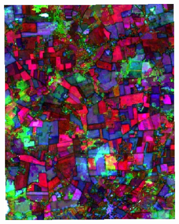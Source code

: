\documentclass[journal,article,submit,pdftex,moreauthors]{Definitions/mdpi}
\providecommand{\DIFaddbeginFL}{} %
\providecommand{\DIFaddendFL}{} %
\providecommand{\DIFdelbeginFL}{} %
\providecommand{\DIFdelendFL}{} %
\begin{document}
\begin{figure}[H]
\begin{subfigure}[t]{0.23\linewidth}
\DIFdelendFL \DIFaddbeginFL \includegraphics[width=0.95\linewidth]{figures/aes_1_layer_mse_results/composites/composite_image_3011141.pdf}
    \DIFaddendFL \caption{}
	\label{fig:color_map_d}
	\end{subfigure}\\[0.2cm]
    \begin{subfigure}[t]{0.23\linewidth}
		\centering
	\DIFdelbeginFL %

\end{subfigure}
\end{figure}
\end{document}
